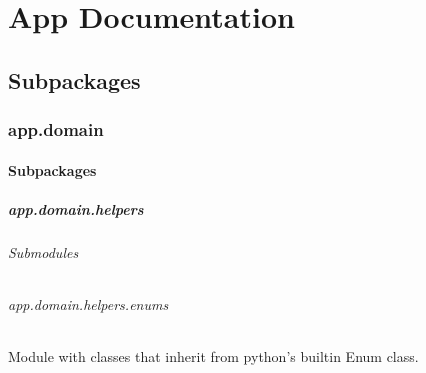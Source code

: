 \documentclass[letterpaper,10pt,english]{sphinxmanual}
\begin{document}
\chapter{App Documentation}
\label{\detokenize{app:app-documentation}}\label{\detokenize{app::doc}}\label{\detokenize{app:module-app}}

\section{Subpackages}
\label{\detokenize{app:subpackages}}

\subsection{app.domain}
\label{\detokenize{app.domain:module-app.domain}}\label{\detokenize{app.domain:app-domain}}\label{\detokenize{app.domain::doc}}

\subsubsection{Subpackages}
\label{\detokenize{app.domain:subpackages}}

\paragraph{app.domain.helpers}
\label{\detokenize{app.domain.helpers:module-app.domain.helpers}}\label{\detokenize{app.domain.helpers:app-domain-helpers}}\label{\detokenize{app.domain.helpers::doc}}

\subparagraph{Submodules}
\label{\detokenize{app.domain.helpers:submodules}}

\subparagraph{app.domain.helpers.enums}
\label{\detokenize{app.domain.helpers:module-app.domain.helpers.enums}}\label{\detokenize{app.domain.helpers:app-domain-helpers-enums}}
Module with classes that inherit from python’s builtin Enum class.
\end{document}
